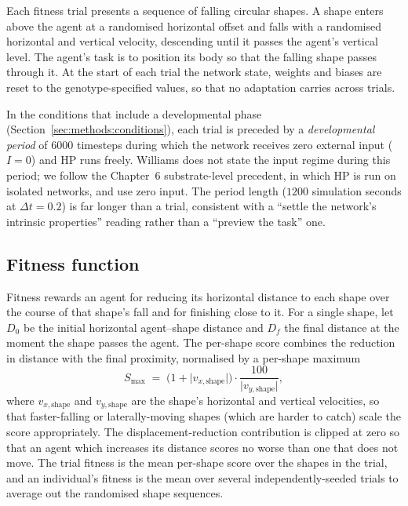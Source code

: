 Each fitness trial presents a sequence of falling circular shapes. A shape
enters above the agent at a randomised horizontal offset and falls with a
randomised horizontal and vertical velocity, descending until it passes the
agent's vertical level. %
The agent's task is to position its body so that the falling shape passes
through it. At the start of each trial the network state, weights and biases are
reset to the genotype-specified values, so that no adaptation carries across
trials.

In the conditions that include a developmental phase
(Section~\ref{sec:methods:conditions}), each trial is preceded by a
\emph{developmental period} of $6000$ timesteps during which the network
receives zero external input ($I = 0$) and HP runs freely. Williams does not
state the input regime during this period; we follow the Chapter~6 substrate-level
precedent, in which HP is run on isolated networks, and use zero input. The
period length ($1200$ simulation seconds at $\Delta t = 0.2$) is far longer than
a trial, consistent with a ``settle the network's intrinsic properties''
reading rather than a ``preview the task'' one.

\subsection{Fitness function}
\label{sec:methods:fitness}

Fitness rewards an agent for reducing its horizontal distance to each shape over
the course of that shape's fall and for finishing close to it. For a single
shape, let $D_0$ be the initial horizontal agent--shape distance and $D_f$ the
final distance at the moment the shape passes the agent. The per-shape score
combines the reduction in distance with the final proximity, normalised by a
per-shape maximum
%
\begin{equation}
  S_{\max} \;=\; \bigl(1 + \lvert v_{x,\text{shape}} \rvert\bigr)
  \cdot \frac{100}{\lvert v_{y,\text{shape}} \rvert},
  \label{eq:smax}
\end{equation}
%
where $v_{x,\text{shape}}$ and $v_{y,\text{shape}}$ are the shape's horizontal
and vertical velocities, so that faster-falling or laterally-moving shapes
(which are harder to catch) scale the score appropriately. The
displacement-reduction contribution is clipped at zero so that an agent which
increases its distance scores no worse than one that does not move. The trial
fitness is the mean per-shape score over the shapes in the trial, and an
individual's fitness is the mean over several independently-seeded trials to
average out the randomised shape sequences. %

